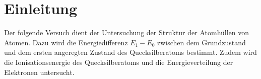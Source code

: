 \section{Einleitung}
\label{sec:einleitung}
Der folgende Versuch dient der Untersuchung der Struktur der Atomhüllen von Atomen. Dazu wird die Energiedifferenz $E_1-E_0$ zwischen dem
Grundzustand und dem ersten angeregten Zustand des Quecksilberatoms bestimmt. Zudem wird die Ionisationsenergie des Quecksilberatoms und 
die Energieverteilung der Elektronen untersucht.
